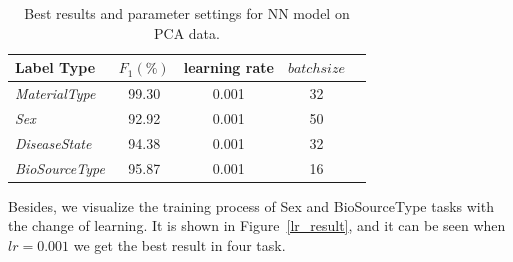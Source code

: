\documentclass[sigconf]{acmart}
\begin{document}
	\begin{table}[tbp]
		\centering
		\begin{tabular}{l|cccc}
			\toprule
			{Label Type} & $F_1 (\%)$ & learning rate &$batch size$  \\
			\midrule
			{\textit{MaterialType}}&99.30 & 0.001 &32\\
			{\textit{Sex}}		& 92.92 & 0.001    &50 \\
			{\textit{DiseaseState}}& 94.38 & 0.001 &32\\
			{\textit{BioSourceType}}& 95.87 & 0.001 &16\\
			\bottomrule	
		\end{tabular}
		
		\caption{Best results and parameter settings for NN model on PCA data. }
		\label{nnpca_result}
	\end{table}
	
	Besides, we visualize the training process of Sex and BioSourceType tasks with the change of learning. It is shown in Figure~\ref{lr_result}, and it can be seen when $lr=0.001$ we get the best result in four task. 
	
\end{document}
